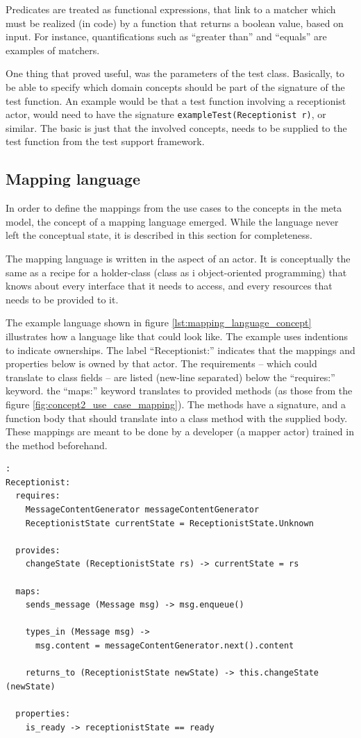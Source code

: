 \noindent 
Predicates are treated as functional expressions, that link to a matcher which must be realized (in code) by a function that returns a boolean value, based on input. For instance, quantifications such as ``greater than'' and ``equals'' are examples of matchers.\medskip

\noindent 
One thing that proved useful, was the parameters of the test class. Basically, to be able to specify which domain concepts should be part of the signature of the test function. An example would be that a test function involving a receptionist actor, would need to have the signature \texttt{exampleTest(Receptionist r)}, or similar. The basic is just that the involved concepts, needs to be supplied to the test function from the test support framework.
\subsection{Mapping language}
In order to define the mappings from the use cases to the concepts in the meta model, the concept of a mapping language emerged. While the language never left the conceptual state, it is described in this section for completeness.\medskip

\noindent The mapping language is written in the aspect of an actor. It is conceptually the same as a recipe for a holder-class (class as i object-oriented programming) that knows about every interface that it needs to access, and every resources that needs to be provided to it.\medskip

\noindent The example language shown in figure \ref{lst:mapping_language_concept} illustrates how a language like that could look like. The example uses indentions to indicate ownerships. The label ``Receptionist:'' indicates that the mappings and properties below is owned by that actor. The requirements -- which could translate to class fields -- are listed (new-line separated) below the ``requires:'' keyword. the ``maps:'' keyword translates to provided methods (as those from the figure \ref{fig:concept2_use_case_mapping}). The methods have a signature, and a function body that should translate into a class method with the supplied body. These mappings are meant to be done by a developer (a mapper actor) trained in the method beforehand.\medskip

\begin{lstlisting}[caption=example language for mapping concepts,label={lst:mapping_language_concept}]:
Receptionist:
  requires:
    MessageContentGenerator messageContentGenerator
    ReceptionistState currentState = ReceptionistState.Unknown
  
  provides:
    changeState (ReceptionistState rs) -> currentState = rs
  
  maps:
    sends_message (Message msg) -> msg.enqueue()

    types_in (Message msg) -> 
      msg.content = messageContentGenerator.next().content
    
    returns_to (ReceptionistState newState) -> this.changeState (newState)

  properties:
    is_ready -> receptionistState == ready
\end{lstlisting}

